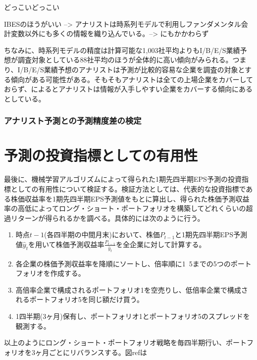 \documentclass[a4paper, 12pt]{jsarticle}
\begin{document}
どっこいどっこい

IBESのほうがいい --> アナリストは時系列モデルで利用しファンダメンタル会計変数以外にも多くの情報を織り込んでいる。--> にもかかわらず

ちなみに、時系列モデルの精度は計算可能な1,003社平均よりもI/B/E/S業績予想が調査対象としている88社平均のほうが全体的に高い傾向がみられる。つまり、I/B/E/S業績予想のアナリストは予測が比較的容易な企業を調査の対象とする傾向がある可能性がある。そもそもアナリストは全ての上場企業をカバーしておらず、\cite{nakai2004}によるとアナリストは情報が入手しやすい企業をカバーする傾向にあるとしている。

\section{アナリスト予測との予測精度差の検定}

\part{予測の投資指標としての有用性}

最後に、機械学習アルゴリズムによって得られた1期先四半期EPS予測の投資指標としての有用性について検証する。検証方法としては、代表的な投資指標である株価収益率を1期先四半期EPS予測値をもとに算出し、得られた株価予測収益率の高低によってロング・ショート・ポートフォリオを構築してどれくらいの超過リターンが得られるかを調べる。具体的には次のように行う。

\begin{enumerate}
  \item 時点$t-1$(各四半期の中間月末)において、株価$P_{t-1}$と1期先四半期EPS予測値$\hat{y}_t$を用いて株価予測収益率$\frac{P_{t-1}}{\hat{y}_t}$を全企業に対して計算する。
  \item 各企業の株価予測収益率を降順にソートし、倍率順に1~5までの5つのポートフォリオを作成する。
  \item 高倍率企業で構成されるポートフォリオ1を空売りし、低倍率企業で構成されるポートフォリオ5を同じ額だけ買う。
  \item 1四半期(3ヶ月)保有し、ポートフォリオ1とポートフォリオ5のスプレッドを観測する。
\end{enumerate}

以上のようにロング・ショート・ポートフォリオ戦略を毎四半期行い、ポートフォリオを3ヶ月ごとにリバランスする。図ref{}は

\end{document}
